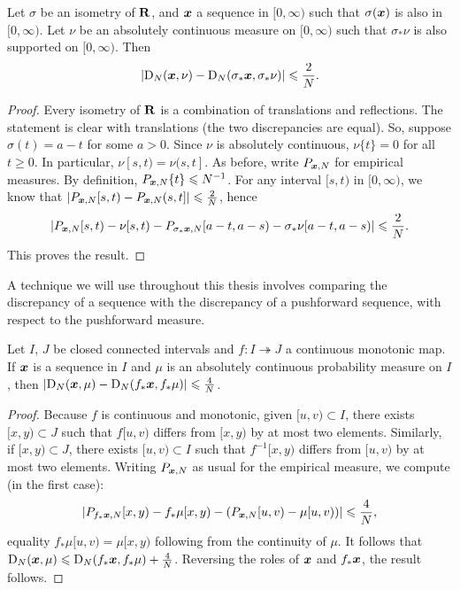 \begin{lemma}\label{lem:flip-discrepancy}
Let $\sigma$ be an isometry of $\mathbf{R}$, and ${\boldsymbol x}$ a sequence in $[0,\infty)$ 
such that $\sigma({\boldsymbol x})$ is also in $[0,\infty)$. Let $\nu$ be an absolutely 
continuous measure on $[0,\infty)$ such that $\sigma_\ast \nu$ is also 
supported on $[0,\infty)$. Then 
\[
	\left|\operatorname{D}_N({\boldsymbol x}, \nu) - \operatorname{D}_N(\sigma_\ast {\boldsymbol x}, \sigma_\ast \nu)\right| \leqslant \frac{2}{N} .
\]
\end{lemma}
\begin{proof}
Every isometry of $\mathbf{R}$ is a combination of translations and reflections. 
The statement is clear with translations (the two discrepancies are equal). So, 
suppose $\sigma(t) = a - t$ for some $a>0$. Since $\nu$ is absolutely 
continuous, $\nu\{t\}=0$ for all $t\geqslant 0$. In particular, 
$\nu[s,t) = \nu(s,t]$. As before, write $P_{{\boldsymbol x},N}$ for empirical measures. By 
definition, $P_{{\boldsymbol x},N}\{t\}\leqslant N^{-1}$. For any 
interval $[s,t)$ in $[0,\infty)$, we know that 
$\left| P_{{\boldsymbol x},N}[s,t) - P_{{\boldsymbol x},N}(s,t]\right| \leqslant \frac{2}{N}$, hence 
\[
	\left| P_{{\boldsymbol x},N}[s,t) - \nu[s,t) - P_{\sigma_\ast {\boldsymbol x},N}[a-t,a-s) - \sigma_\ast \nu[a-t,a-s)\right| \leqslant \frac{2}{N} .
\]
This proves the result. 
\end{proof}

A technique we will use throughout this thesis involves comparing the 
discrepancy of a sequence with the discrepancy of a pushforward sequence, 
with respect to the pushforward measure. 

\begin{lemma}\label{lem:push-discrepancy}
Let $I$, $J$ be closed connected intervals and $f\colon I\twoheadrightarrow J$ 
a continuous monotonic map. If ${\boldsymbol x}$ is a sequence in $I$ and $\mu$ is an 
absolutely continuous probability measure on $I$, then 
$\left|\operatorname{D}_N({\boldsymbol x},\mu) - \operatorname{D}_N(f_\ast {\boldsymbol x},f_\ast\mu)\right| \leqslant \frac 4 N$.
\end{lemma}
\begin{proof}
Because $f$ is continuous and monotonic, given $[u,v)\subset I$, there exists 
$[x,y)\subset J$ such that $f[u,v)$ differs from $[x,y)$ by at most two 
elements. Similarly, if $[x,y)\subset J$, there exists $[u,v)\subset I$ such 
that $f^{-1}[x,y)$ differs from $[u,v)$ by at most two elements. Writing 
$P_{{\boldsymbol x},N}$ as usual for the empirical measure, we compute (in the first 
case):
\[
	\left| P_{f_\ast{\boldsymbol x},N}[x,y) - f_\ast\mu[x,y) - \left(P_{{\boldsymbol x},N}[u,v) - \mu[u,v)\right)\right| \leqslant \frac 4 N ,
\]
equality $f_\ast\mu[u,v) = \mu[x,y)$ following from the continuity of $\mu$. 
It follows that 
$\operatorname{D}_N({\boldsymbol x},\mu) \leqslant \operatorname{D}_N(f_\ast {\boldsymbol x},f_\ast\mu) + \frac 4 N$. Reversing 
the roles of ${\boldsymbol x}$ and $f_\ast {\boldsymbol x}$, the result follows. 
\end{proof}

